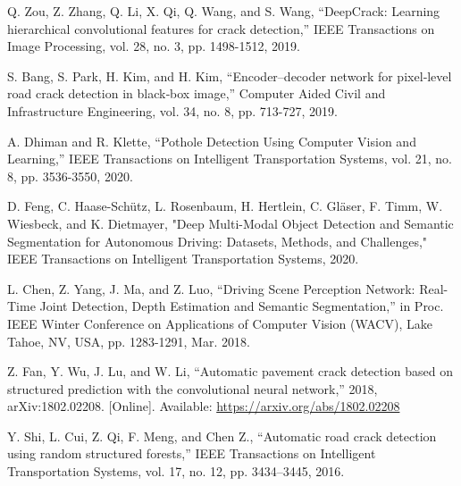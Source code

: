 \documentclass{ieeeaccess}
\begin{document}
\begin{thebibliography}{00}
 Q. Zou, Z. Zhang, Q. Li, X. Qi, Q. Wang, and S. Wang, ``DeepCrack: Learning hierarchical convolutional features for crack detection,'' IEEE Transactions on Image Processing, vol. 28, no. 3, pp. 1498-1512, 2019.

 S. Bang, S. Park, H. Kim, and H. Kim, ``Encoder–decoder network for pixel‐level road crack detection in black‐box image,''  Computer Aided Civil and Infrastructure Engineering, vol. 34, no. 8, pp. 713-727, 2019.

 A. Dhiman and R. Klette, ``Pothole Detection Using Computer Vision and Learning,'' IEEE Transactions on Intelligent Transportation Systems, vol. 21, no. 8, pp. 3536-3550, 2020.

 D. Feng, C. Haase-Schütz, L. Rosenbaum, H. Hertlein, C. Gläser, F. Timm, W. Wiesbeck, and K. Dietmayer, "Deep Multi-Modal Object Detection and Semantic Segmentation for Autonomous Driving: Datasets, Methods, and Challenges," IEEE Transactions on Intelligent Transportation Systems, 2020.

 L. Chen, Z. Yang, J. Ma, and Z. Luo, ``Driving Scene Perception Network: Real-Time Joint Detection, Depth Estimation and Semantic Segmentation,'' in Proc. IEEE Winter Conference on Applications of Computer Vision (WACV), Lake Tahoe, NV, USA, pp. 1283-1291, Mar. 2018.

 Z. Fan, Y. Wu, J. Lu, and W. Li, ``Automatic pavement crack detection based on structured prediction with the convolutional neural network,'' 2018, arXiv:1802.02208. [Online]. Available: \underline{https://arxiv.org/abs/1802.02208}

 Y. Shi, L. Cui, Z. Qi, F. Meng, and Chen Z., ``Automatic road crack detection using random structured forests,'' IEEE Transactions on Intelligent Transportation Systems, vol. 17, no. 12, pp. 3434–3445, 2016.


\end{thebibliography}
\end{document}
